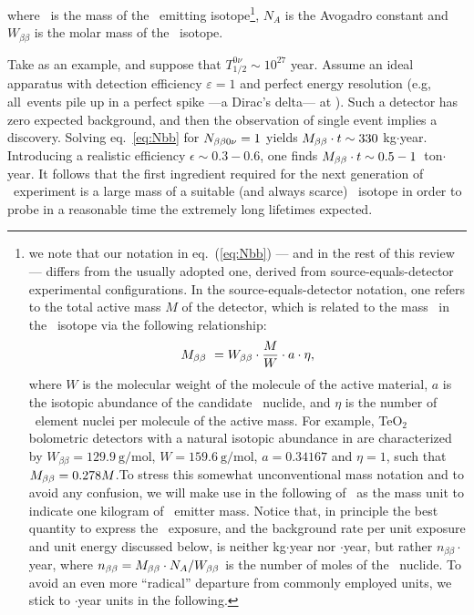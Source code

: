 where \Mbb\ is the mass of the \bb\ emitting isotope\footnote{we note that our notation in eq.~(\ref{eq:Nbb}) --- and in the rest of this review --- differs from the usually adopted one, derived from source-equals-detector experimental configurations. In the source-equals-detector notation, one refers to the total active mass $M$ of the detector, which is related to the mass \Mbb\ in the \bb\ isotope via the following relationship:
%
\begin{equation}
M_{\beta\beta}\ = W_{\beta\beta}\cdot \frac{M}{W}\cdot a\cdot \eta ,
\label{eq:mbbversusm}
\end{equation}
%
where $W$ is the molecular weight of the molecule of the active material, $a$ is the isotopic abundance of the candidate \bbonu\ nuclide, and $\eta$ is the number of \bbonu\ element nuclei per molecule of the active mass. For example, TeO$_2$ bolometric detectors with a natural isotopic abundance in  are characterized by $W_{\beta\beta}=129.9\ \mathrm{g/mol}$, $W=159.6\ \mathrm{g/mol}$, $a=0.34167$ and $\eta=1$, such that $M_{\beta\beta} = 0.278 M$.To stress this somewhat unconventional mass notation and to avoid any confusion, we will make use in the following of \kgbb\ as the mass unit to indicate one kilogram of \bb\ emitter mass. Notice that, in principle the best quantity to express the \bbonu\ exposure, and the background rate per unit exposure and unit energy discussed below, is neither kg$\cdot$year nor \kgbb $\cdot$year, but rather $n_{\beta\beta}\cdot$year, where $n_{\beta\beta}=M_{\beta\beta} \cdot N_A/W_{\beta\beta}$ is the number of moles of the \bb\ nuclide. To avoid an even more ``radical'' departure from commonly employed units, we stick to \kgbb$\cdot$year units in the following.}, $N_{A}$ is the Avogadro constant and $W_{\beta\beta}$ is the molar mass of the \bb\ isotope.

Take  as an example, and suppose that 
$T_{1/2}^{0\nu}\sim 10^{27}$ year. Assume an ideal apparatus with detection efficiency $\varepsilon =1$ and perfect energy resolution (e.g, all\bbonu\ events pile up in a perfect spike ---a Dirac's delta--- at \Qbb). Such a detector has zero expected background, and then the observation of single event implies a discovery. Solving eq.~\ref{eq:Nbb} for $ N_{\beta\beta0\nu}=1$ yields  $M_{\beta\beta} \cdot t \sim 330$ kg$\cdot$year. %
Introducing a realistic efficiency $\epsilon \sim 0.3-0.6$, one finds $M_{\beta\beta} \cdot t \sim 0.5-1$~ton$\cdot$year. It follows that the first ingredient required for the next generation of \bbonu\ experiment is a 
 large mass of a suitable (and always scarce) \bb\ isotope in order to probe in a reasonable time the extremely long lifetimes expected. 

